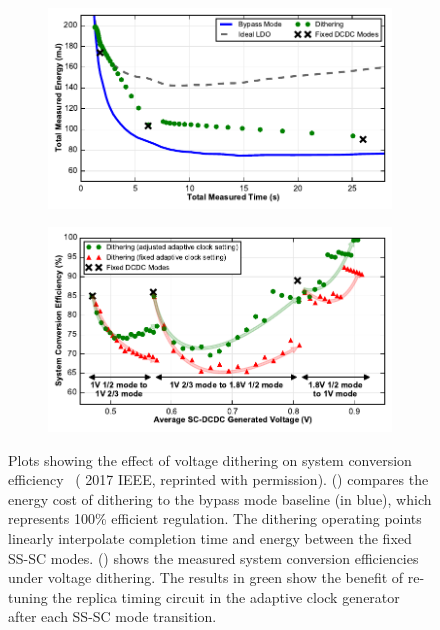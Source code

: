 \documentclass[graybox]{svmult}
\begin{document}
\begin{figure}
  \centering
  \begin{subfigure}[t]{0.8\textwidth}
  \centering
  \includegraphics[width=\textwidth]{6-raven4-voltage-dithering-a}
  \caption{}
  \label{fig:6-raven4-voltage-dithering-a}
  \end{subfigure}
  \par\bigskip
  \begin{subfigure}[t]{0.8\textwidth}
  \centering
  \includegraphics[width=\textwidth]{6-raven4-voltage-dithering-b}
  \caption{}
  \label{fig:6-raven4-voltage-dithering-b}
  \end{subfigure}
  \caption{Plots showing the effect of voltage dithering on system conversion efficiency~\cite{Keller2017} ({\textcopyright} 2017 IEEE, reprinted with permission).  () compares the energy cost of dithering to the bypass mode baseline (in blue), which represents 100\% efficient regulation.  The dithering operating points linearly interpolate completion time and energy between the fixed SS-SC modes.  () shows the measured system conversion efficiencies under voltage dithering.  The results in green show the benefit of re-tuning the replica timing circuit in the adaptive clock generator after each SS-SC mode transition.}
  \label{fig:6-raven4-voltage-dithering}
\end{figure}
\end{document}
